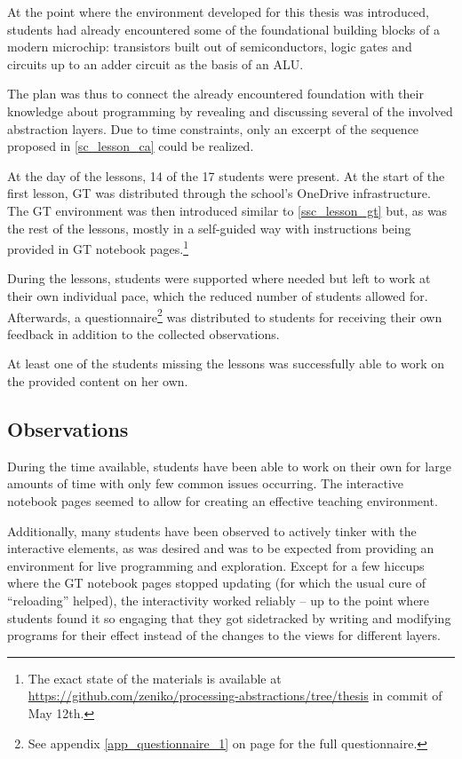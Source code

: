 At the point where the environment developed for this thesis was introduced, students had already encountered some of the foundational building blocks of a modern microchip: transistors built out of semiconductors, logic gates and circuits up to an adder circuit as the basis of an \ac{ALU}.

The plan was thus to connect the already encountered foundation with their knowledge about programming by revealing and discussing several of the involved abstraction layers. Due to time constraints, only an excerpt of the sequence proposed in \ref{sc_lesson_ca} could be realized.

At the day of the lessons, 14 of the 17 students were present. At the start of the first lesson, \ac{GT} was distributed through the school's OneDrive infrastructure. The \ac{GT} environment was then introduced similar to \ref{ssc_lesson_gt} but, as was the rest of the lessons, mostly in a self-guided way with instructions being provided in \ac{GT} notebook pages.\footnote{The exact state of the materials is available at \url{https://github.com/zeniko/processing-abstractions/tree/thesis} in commit  of May 12th.}

During the lessons, students were supported where needed but left to work at their own individual pace, which the reduced number of students allowed for. Afterwards, a questionnaire\footnote{See appendix \ref{app_questionnaire_1} on page \pageref{app_questionnaire_1} for the full questionnaire.} was distributed to students for receiving their own feedback in addition to the collected observations.

At least one of the students missing the lessons was successfully able to work on the provided content on her own.


\subsection{Observations}

During the time available, students have been able to work on their own for large amounts of time with only few common issues occurring. The interactive notebook pages seemed to allow for creating an effective teaching environment.

Additionally, many students have been observed to actively tinker with the interactive elements, as was desired and was to be expected from providing an environment for live programming and exploration. Except for a few hiccups where the \ac{GT} notebook pages stopped updating (for which the usual cure of ``reloading'' helped), the interactivity worked reliably -- up to the point where students found it so engaging that they got sidetracked by writing and modifying programs for their effect instead of the changes to the views for different layers.

